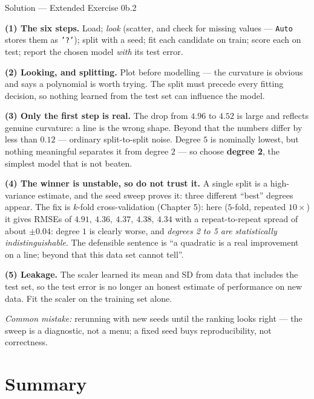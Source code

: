 \documentclass[aspectratio=169,11pt]{beamer}
\begin{document}
\begin{frame}{Solution --- Extended Exercise 0b.2}
  \begin{solutionbox}
    \scriptsize
    \textbf{(1) The six steps.} Load; \emph{look} (scatter, and check for
    missing values --- \texttt{Auto} stores them as \texttt{'?'}); split with
    a seed; fit each candidate on train; score each on test; report the
    chosen model \emph{with} its test error.

    \textbf{(2) Looking, and splitting.} Plot before modelling --- the
    curvature is obvious and says a polynomial is worth trying. The split must
    precede every fitting decision, so nothing learned from the test set can
    influence the model.

    \textbf{(3) Only the first step is real.} The drop from $4.96$ to $4.52$
    is large and reflects genuine curvature: a line is the wrong shape. Beyond
    that the numbers differ by less than $0.12$ --- ordinary split-to-split
    noise. Degree $5$ is nominally lowest, but nothing meaningful separates it
    from degree $2$ --- so choose \textbf{degree 2}, the simplest model that
    is not beaten.

    \textbf{(4) The winner is unstable, so do not trust it.} A single split
    is a high-variance estimate, and the seed sweep proves it: three different
    ``best'' degrees appear. The fix is $k$-fold cross-validation (Chapter 5):
    here ($5$-fold, repeated $10\times$) it gives RMSEs of
    $4.91,\ 4.36,\ 4.37,\ 4.38,\ 4.34$ with a repeat-to-repeat spread of about
    $\pm0.04$: degree $1$ is clearly worse, and \emph{degrees 2 to 5 are
    statistically indistinguishable}. The defensible sentence is ``a quadratic
    is a real improvement on a line; beyond that this data set cannot tell''.

    \textbf{(5) Leakage.} The scaler learned its mean and SD from data that
    includes the test set, so the test error is no longer an honest estimate
    of performance on new data. Fit the scaler on the training set alone.

    \textit{Common mistake:} rerunning with new seeds until the ranking
    looks right --- the sweep is a diagnostic, not a menu; a fixed seed buys
    reproducibility, not correctness.
  \end{solutionbox}
\end{frame}


\section{Summary}
\end{document}
